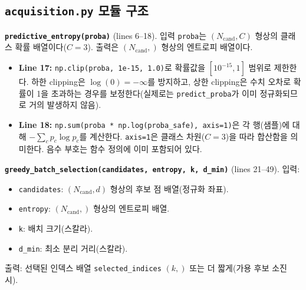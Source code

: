 \documentclass[11pt]{article}
\begin{document}
\subsection{\texttt{acquisition.py} 모듈 구조}

\textbf{\texttt{predictive\_entropy(proba)}} (lines 6--18). 입력 \texttt{proba}는 $(N_{\text{cand}}, C)$ 형상의 클래스 확률 배열이다($C = 3$). 출력은 $(N_{\text{cand}},)$ 형상의 엔트로피 배열이다.

\begin{itemize}
  \item \textbf{Line 17:} \texttt{np.clip(proba, 1e-15, 1.0)}로 확률값을 $[10^{-15}, 1]$ 범위로 제한한다. 하한 clipping은 $\log(0) = -\infty$를 방지하고, 상한 clipping은 수치 오차로 확률이 1을 초과하는 경우를 보정한다(실제로는 \texttt{predict\_proba}가 이미 정규화되므로 거의 발생하지 않음).
  \item \textbf{Line 18:} \texttt{np.sum(proba * np.log(proba\_safe), axis=1)}은 각 행(샘플)에 대해 $-\sum_c p_c \log p_c$를 계산한다. \texttt{axis=1}은 클래스 차원($C = 3$)을 따라 합산함을 의미한다. 음수 부호는 함수 정의에 이미 포함되어 있다.
\end{itemize}

\textbf{\texttt{greedy\_batch\_selection(candidates, entropy, k, d\_min)}} (lines 21--49). 입력:
\begin{itemize}
  \item \texttt{candidates}: $(N_{\text{cand}}, d)$ 형상의 후보 점 배열(정규화 좌표).
  \item \texttt{entropy}: $(N_{\text{cand}},)$ 형상의 엔트로피 배열.
  \item \texttt{k}: 배치 크기(스칼라).
  \item \texttt{d\_min}: 최소 분리 거리(스칼라).
\end{itemize}

출력: 선택된 인덱스 배열 \texttt{selected\_indices} $(k,)$ 또는 더 짧게(가용 후보 소진 시).
\end{document}
